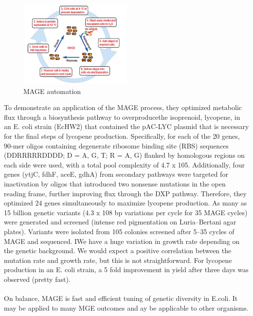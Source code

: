 \begin{figure}
\includegraphics[width=0.5\textwidth, center ]{mage}
\caption{\label{fig:pure} MAGE automation}
\end{figure}
\noindent
To demonstrate an application of the MAGE process, they optimized metabolic flux through a biosynthesis pathway to overproducethe isoprenoid, lycopene, in an E. coli strain (EcHW2) that contained the pAC-LYC plasmid that is necessary for the final steps of lycopene production.
Specifically, for each of the 20 genes, 90-mer oligos containing degenerate ribosome binding site (RBS) sequences (DDRRRRRDDDD; D = A, G, T; R = A, G) flanked by homologous regions on each side were used, with a total pool complexity of 4.7 x 105.
Additionally, four genes (ytjC, fdhF, aceE, gdhA) from secondary pathways were targeted for inactivation by oligos that introduced
two nonsense mutations in the open reading frame, further improving flux through the DXP pathway.
Therefore, they optimized 24 genes simultaneously to maximize lycopene production.
As many as 15 billion genetic variants (4.3 x 108 bp variations per cycle for 35 MAGE cycles) were generated and screened (intense red pigmentation on Luria–Bertani agar plates).
Variants were isolated from 105 colonies screened after 5–35 cycles of MAGE and sequenced.
IWe have a huge variation in growth rate depending on the genetic background. We would expect a positive correlation between the mutation rate and growth rate,  but this is not straightforward.
For lycopene production in an E. coli strain, a 5 fold improvement in yield after three days was observed (pretty fast).
\\
\\
\noindent
On balance, MAGE is fast and efficient tuning of genetic diversity in E.coli. 
It may be applied to many MGE outcomes and ay be applicable to other organisms.

